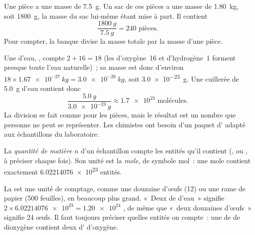 \begin{example}\label{ex:g10:the-mole:coins}
Une pièce a une masse de \qty{7.5}{g}. Un sac de ces pièces a une masse
de \qty{1.80}{kg}, soit \qty{1800}{g}, la masse du sac lui-même étant
mise à part. Il contient
\[
  \frac{\qty{1800}{g}}{\qty{7.5}{g}} = 240 \text{ pièces.}
\]
Pour compter, la banque divise la masse totale par la masse d'une pièce.
\end{example}

\begin{example}\label{ex:g10:the-mole:spoon}
Une  d'eau, , compte $2 + 16 = 18$  (les 
d'oxygène~16 et d'hydrogène~1 forment presque toute l'eau naturelle)~;
sa masse est donc d'environ
$18 \times \qty{1.67e-27}{kg} = \qty{3.0e-26}{kg}$, soit
\qty{3.0e-23}{g}. Une cuillerée de \qty{5.0}{g} d'eau contient donc
\[
  \frac{\qty{5.0}{g}}{\qty{3.0e-23}{g}} \approx \num{1.7e23}
  \text{ molécules.}
\]
La division se fait comme pour les pièces, mais le résultat est un
nombre que personne ne peut se représenter. Les chimistes ont besoin
d'un paquet d' adapté aux échantillons du laboratoire.
\end{example}

\begin{definition}\label{def:g10:the-mole:amount}
La \emph{quantité de matière} $n$ d'un
échantillon compte les entités qu'il contient (,  ou
, à préciser chaque fois). Son unité est la \emph{mole},
de symbole \si{mol}~: une mole contient exactement
\num{6.02214076e23} entités.
\end{definition}

\begin{remark}\label{rem:g10:the-mole:dozen}
La  est une unité de comptage, comme une douzaine d'œufs (12) ou
une rame de papier (500 feuilles), en beaucoup plus grand. «~Deux 
de  d'eau~» signifie $2 \times \num{6.02214076e23} = \num{1.20e24}$
, de même que «~deux douzaines d'œufs~» signifie 24 œufs. Il
faut toujours préciser quelles entités on compte~: une  de
\emph{} de dioxygène  contient deux 
d'\emph{} d'oxygène.
\end{remark}

